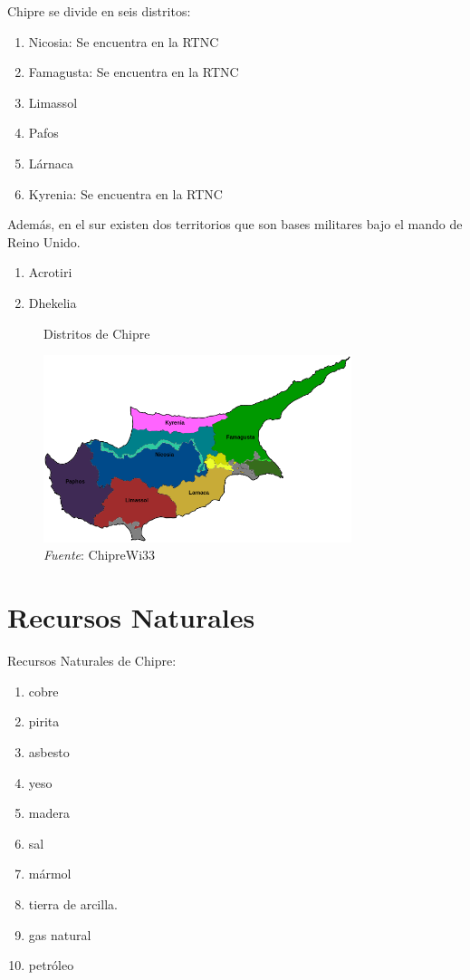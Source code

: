 \documentclass[a4paper,openright,12pt]{book}
\begin{document}
Chipre se divide en seis distritos:

\begin{enumerate}
    \item Nicosia: Se encuentra en la RTNC
    \item Famagusta: Se encuentra en la RTNC
    \item Limassol
    \item Pafos
    \item Lárnaca
    \item Kyrenia: Se encuentra en la RTNC
\end{enumerate}

 Además, en el sur existen dos territorios que son bases militares bajo el mando de Reino Unido.

\begin{enumerate}
    \item Acrotiri
    \item Dhekelia
\end{enumerate}

\begin{figure}[ht]
    \centering
    \caption{Distritos de Chipre}
    \includegraphics[width=9cm]{mapa_distritos.png}
    \caption*{\textit{Fuente}: {ChipreWi33}}
    \label{mapdistrics}
\end{figure}

\section{Recursos Naturales}

Recursos Naturales de Chipre:

\begin{enumerate}
    \item cobre
    \item pirita
    \item asbesto
    \item yeso
    \item madera
    \item sal
    \item mármol
    \item tierra de arcilla.
    \item gas natural
    \item petróleo
\end{enumerate}
\end{document}
